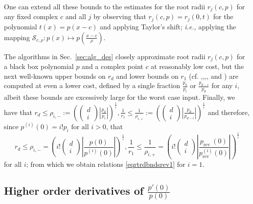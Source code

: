\documentclass[runningheads]{llncs}
\begin{document}

One can extend all these bounds to the estimates for the root radii $r_{j}(c, p)$ for any fixed complex $c$ and all $j$ by observing that $r_{j}(c, p)=r_{j}(0, t)$ for the polynomial $t(x)=p(x-c)$ and applying Taylor's shift; \emph{i.e.,} applying the mapping $\mathcal{S}_{c ,\rho }:p(x) \mapsto p\left( \frac{x - c}{\rho} \right)$.

The algorithms in Sec.~\ref{sec:alg_des} closely approximate root radii $r_{j}(c, p)$ for a black box polynomial $p$ and a complex point $c$ at reasonably low cost, but the next well-known upper bounds on $r_{d}$ and lower bounds on $r_{1}$ (cf. \cite{kerimov1977applied},\cite{carstensen1991inclusion},\cite{pan2000approximating},\cite{bini2000design}, and \cite{bini2014solving}) are computed at even a lower cost, defined by a single fraction $\frac{p_{0}}{p_{i}}$ or $\frac{p_{d-i}}{p_{d}}$ for any $i$, albeit these bounds are excessively large for the worst case input.
Finally, we have that
$r_{d} \leq \rho_{i,-}:=\left(\left(\begin{array}{c}d \\ i\end{array}\right)\left|\frac{p_{0}}{p_{i}}\right|\right)^{\frac{1}{i}}, \frac{1}{r_{1}} \leq \frac{1}{\rho_{i,+}}:=\left(\left(\begin{array}{l}d \\ i\end{array}\right)\left|\frac{p_{d}}{p_{d-i}}\right|\right)^{\frac{1}{i}}$
and therefore, since $p^{(i)}(0)=i ! p_{i} \text { for all } i>0$, that
\begin{equation}\label{eq:last_appen}
r_{d} \leq \rho_{i,-}=\left(i !\left(\begin{array}{c}
d \\
i
\end{array}\right)\left|\frac{p(0)}{p^{(i)}(0)}\right|\right)^{\frac{1}{i}}, \frac{1}{r_{1}} \leq \frac{1}{\rho_{i,+}}=\left(i !\left(\begin{array}{c}
d \\
i
\end{array}\right)\left|\frac{p_{\text {rev }}(0)}{p_{\text {rev }}^{(i)}(0)}\right|\right)^{\frac{1}{i}}
\end{equation}
for all $i$; from which we obtain relations \ref{eqrtrdbndsrev1} for $i=1$.




\subsection{Higher order derivatives of $\frac{p'(0)}{p(0)}$}
\end{document}
